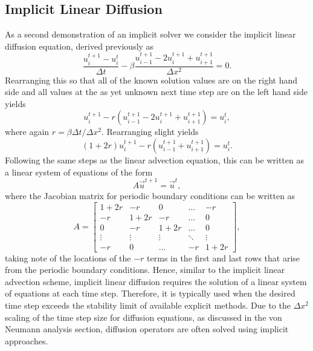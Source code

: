 \subsection{Implicit Linear Diffusion}
As a second demonstration of an implicit solver we consider the implicit linear diffusion equation, derived previously as
\begin{equation}
  \frac{u_i^{t+1} - u_{i}^t}{\Delta t} - \beta \frac{u_{i-1}^{t+1} - 2u_i^{t+1} + u_{i+1}^{t+1}}{\Delta x^2} = 0.
\end{equation}
Rearranging this so that all of the known solution values are on the right hand side and all values at the as yet unknown next time step are on the left hand side yields
\begin{equation}
  u_i^{t+1} - r (u_{i-1}^{t+1} - 2u_i^{t+1} + u_{i+1}^{t+1}) = u_{i}^t,
\end{equation}
where again $r = \beta \Delta t / \Delta x^2$. Rearranging slight yields
\begin{equation}
  (1+2r)u_i^{t+1} - r (u_{i-1}^{t+1} + u_{i+1}^{t+1}) = u_{i}^t.
\end{equation}
Following the same steps as the linear advection equation, this can be written as a linear system of equations of the form
\begin{equation}
	A \vec{u}^{t+1} = \vec{u}^{t},
\end{equation}
where the Jacobian matrix for periodic boundary conditions can be written as
\begin{equation}
	A = 
	\begin{bmatrix}
	    1+2r & -r & 0 & \dots  & -r \\
	    -r & 1+2r & -r & \dots  & 0 \\
			0 & -r & 1+2r & \dots  & 0 \\
	    \vdots & \vdots & \vdots & \ddots & \vdots \\
	    -r & 0 & \dots & -r & 1+2r
	\end{bmatrix},
\end{equation}
taking note of the locations of the $-r$ terms in the first and last rows that arise from the periodic boundary conditions. Hence, similar to the implicit linear advection scheme, implicit linear diffusion requires the solution of a linear system of equations at each time step. Therefore, it is typically used when the desired time step exceeds the stability limit of available explicit methods. Due to the $\Delta x^2$ scaling of the time step size for diffusion equations, as discussed in the von Neumann analysis section, diffusion operators are often solved using implicit approaches.

